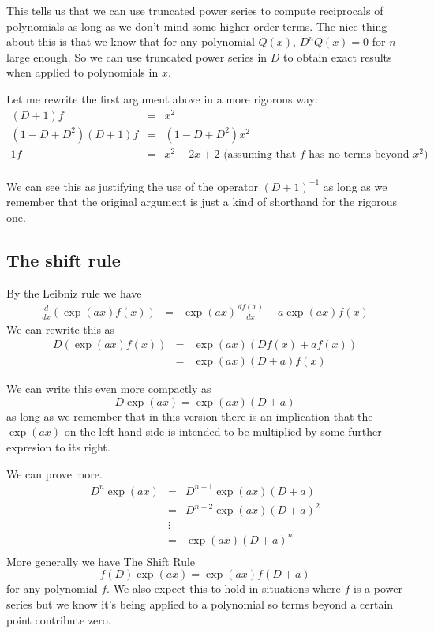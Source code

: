 \documentclass[a4paper]{article}
\theoremstyle{definition}
\begin{document}
This tells us that we can use truncated power series to compute reciprocals of polynomials as long as we don't mind some higher order terms.
The nice thing about this is that we know that for any polynomial $Q(x)$, $D^nQ(x) = 0$ for $n$ large enough.
So we can use truncated power series in $D$ to obtain exact results when applied to polynomials in $x$.

Let me rewrite the first argument above in a more rigorous way:
\begin{eqnarray*}
(D+1)f & = & x^2 \\
(1-D+D^2)(D+1)f & = & (1-D+D^2)x^2 \\
     1f & = & x^2-2x+2 \mbox{ (assuming that $f$ has no terms beyond $x^2$)} \\
\end{eqnarray*}

We can see this as justifying the use of the operator $(D+1)^{-1}$ as long as we remember that the original argument is just a kind of shorthand for the rigorous one.

\subsection{The shift rule}
By the Leibniz rule we have
\begin{eqnarray*}
\frac{d}{dx}(\exp(ax)f(x)) & = & \exp(ax)\frac{df(x)}{dx}+a\exp(ax)f(x)
\end{eqnarray*}
We can rewrite this as
\begin{eqnarray*}
D(\exp(ax)f(x)) & = & \exp(ax)(Df(x)+af(x)) \\
                & = & \exp(ax)(D+a)f(x)
\end{eqnarray*}

We can write this even more compactly as
\[
D\exp(ax) = \exp(ax)(D+a)
\]
as long as we remember that in this version there is an implication that the $\exp(ax)$ on the left hand side is intended to be multiplied by some further expresion to its right.

We can prove more.
\begin{eqnarray*}
D^n\exp(ax) & = & D^{n-1}\exp(ax)(D+a) \\
            & = & D^{n-2}\exp(ax)(D+a)^2 \\
            & \vdots & \\
            & = & \exp(ax)(D+a)^n \\
\end{eqnarray*}
More generally we have The Shift Rule
\[
\boxed{f(D)\exp(ax) = \exp(ax)f(D+a)}
\]
for any polynomial $f$.
We also expect this to hold in situations where $f$ is a power series but we know it's being applied to a polynomial so terms beyond a certain point contribute zero.
\end{document}
